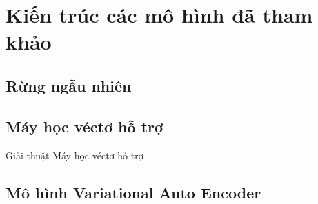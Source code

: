 \section{Kiến trúc các mô hình đã tham khảo}

\subsection{Rừng ngẫu nhiên}

\subsection{Máy học véctơ hỗ trợ}
Giải thuật Máy học véctơ hỗ trợ 

\subsection{Mô hình Variational Auto Encoder}